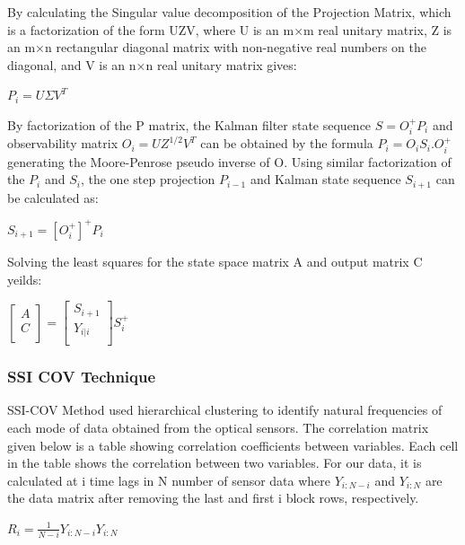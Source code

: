 \documentclass{article}
\begin{document}
By calculating the Singular value decomposition of the Projection Matrix, which is a factorization of the form UZV, where U is an m×m real unitary matrix, Z is an m×n rectangular diagonal matrix with non-negative real numbers on the diagonal, and V is an n×n real unitary matrix gives:

\begin{center}
    $P_i = U\Sigma V^T$
\end{center}

By factorization of the P matrix, the Kalman filter state sequence $S = O_i^+ P_i$ and observability matrix $O_i = UZ^{1/2}V^T$ can be obtained by the formula $P_i = O_iS_i.O_i^+$ generating the Moore-Penrose pseudo inverse of O. Using similar factorization of the $P_i$ and $S_i$, the one step projection $P_{i-1}$ and Kalman state sequence $S_{i+1}$ can be calculated as:

\begin{center}
    $S_{i+1} = [O_i^+]^+ P_i$
\end{center}

Solving the least squares for the state space matrix A and output matrix C yeilds:

\begin{center}
    $\begin{bmatrix} A\\ C\\ \end{bmatrix} = \begin{bmatrix} S_{i+1}\\ Y_{i|i}\\ \end{bmatrix} S_i^+$
\end{center}

\subsubsection{SSI COV Technique}
SSI-COV Method used hierarchical clustering to identify natural frequencies of each mode of data obtained from the optical sensors. The correlation matrix given below is a table showing correlation coefficients between variables. Each cell in the table shows the correlation between two variables. For our data, it is calculated at i time lags in N number of sensor data where $Y_{i:N-i}$ and $Y_{i:N}$ are the data matrix after removing the last and first i block rows, respectively.

\begin{center}
    $R_i = \frac{1}{N-i}Y_{i:N-i}Y_{i:N}$
\end{center}
\end{document}
